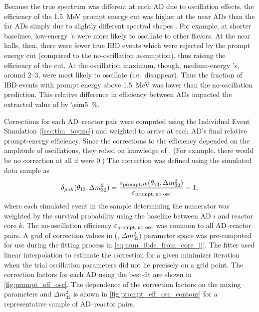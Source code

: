 Because the true \nuebar{} spectrum was different at each AD
due to oscillation effects,
the efficiency of the \SI{1.5}{\MeV} prompt energy cut
was higher at the near ADs than the far ADs
simply due to slightly different spectral shapes \cite{nh2016}.
For example, at shorter baselines, low-energy \nuebar{}'s
were more likely to oscillate to other flavors. At the near halls, then,
there were fewer true IBD events which were rejected by the prompt energy cut
(compared to the no-oscillation assumption),
thus raising the efficiency of the cut.
At the oscillation maximum, though, medium-energy \nuebar{}'s,
around \SIrange{2}{3}{\mev}, were most likely to oscillate (i.e.\ disappear).
Thus the fraction of IBD events with prompt energy above \SI{1.5}{\MeV}
was lower than the no-oscillation prediction.
This relative difference in efficiency between ADs
impacted the extracted value of \thetaot{} by \SI{\sim5}{\percent}.

Corrections for each AD--reactor pair were computed
using the Individual Event Simulation (\cref{sec:thu_toymc})
and weighted to arrive at each AD's final relative prompt-energy efficiency.
Since the corrections to the efficiency depended on
the amplitude of \nuebar{} oscillations, they relied on knowledge of \thetaot.
(For example, there would be no correction at all if \thetaot{} were $0$.)
The correction was defined using the simulated data sample as
\begin{equation}\label{eq:prompt_osc_correction}
    \delta_{p,ik}(\theta_{13}, \Delta m^2_{32}) =
    \frac{\varepsilon_{\text{prompt},ik}(\theta_{13}, \Delta m^2_{32})}{
        \varepsilon_{\text{prompt,\,no osc}}
    } - 1,
\end{equation}
where each simulated event in the sample determining the numerator
was weighted by the survival probability
using the baseline between AD $i$ and reactor core $k$.
The no-oscillation efficiency $\varepsilon_{\text{prompt,\,no osc}}$
was common to all AD--reactor pairs.
A grid of correction values in (\thetaot{}, $\Delta m^2_{32}$) parameter space
was pre-computed for use during the fitting process
in \cref{eq:num_ibds_from_core_ij}.
The fitter used linear interpolation to estimate the correction for
a given minimizer iteration when the trial oscillation parameters
did not lie precisely on a grid point.
The correction factors for each AD using the best-fit \thetaot{}
are shown in \cref{fig:prompt_eff_osc}.
The dependence of the correction factors
on the mixing parameters \thetaot{} and $\Delta m^2_{32}$
is shown in \cref{fig:prompt_eff_osc_contour}
for a representative sample of AD--reactor pairs.

